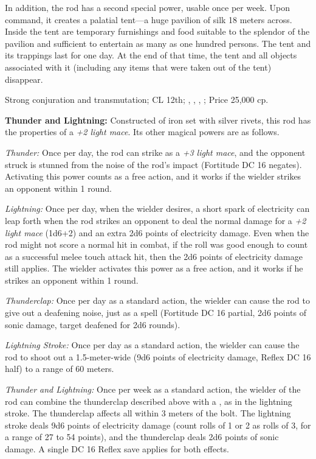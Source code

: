 In addition, the rod has a second special power, usable once per week. Upon command, it creates a palatial tent---a huge pavilion of silk 18 meters across. Inside the tent are temporary furnishings and food suitable to the splendor of the pavilion and sufficient to entertain as many as one hundred persons. The tent and its trappings last for one day. At the end of that time, the tent and all objects associated with it (including any items that were taken out of the tent) disappear.

Strong conjuration and transmutation; CL 12th; , , , ; Price 25,000 cp.

\textbf{Thunder and Lightning:} Constructed of iron set with silver rivets, this rod has the properties of a \emph{+2 light mace}. Its other magical powers are as follows.
\begin{itemize*}
\item \textit{Thunder:} Once per day, the rod can strike as a \emph{+3 light mace}, and the opponent struck is stunned from the noise of the rod's impact (Fortitude DC 16 negates). Activating this power counts as a free action, and it works if the wielder strikes an opponent within 1 round.
\item \textit{Lightning:} Once per day, when the wielder desires, a short spark of electricity can leap forth when the rod strikes an opponent to deal the normal damage for a \emph{+2 light mace} (1d6+2) and an extra 2d6 points of electricity damage. Even when the rod might not score a normal hit in combat, if the roll was good enough to count as a successful melee touch attack hit, then the 2d6 points of electricity damage still applies. The wielder activates this power as a free action, and it works if he strikes an opponent within 1 round.
\item \textit{Thunderclap:} Once per day as a standard action, the wielder can cause the rod to give out a deafening noise, just as a  spell (Fortitude DC 16 partial, 2d6 points of sonic damage, target deafened for 2d6 rounds).
\item \textit{Lightning Stroke:} Once per day as a standard action, the wielder can cause the rod to shoot out a 1.5-meter-wide  (9d6 points of electricity damage, Reflex DC 16 half) to a range of 60 meters.
\item \textit{Thunder and Lightning:} Once per week as a standard action, the wielder of the rod can combine the thunderclap described above with a , as in the lightning stroke. The thunderclap affects all within 3 meters of the bolt. The lightning stroke deals 9d6 points of electricity damage (count rolls of 1 or 2 as rolls of 3, for a range of 27 to 54 points), and the thunderclap deals 2d6 points of sonic damage. A single DC 16 Reflex save applies for both effects.
\end{itemize*}

